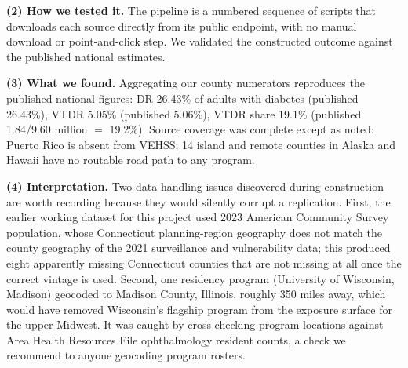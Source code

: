 \documentclass[11pt]{article}
\newcommand{\tpart}[1]{\medskip\noindent\textbf{#1}\quad}
\begin{document}
\tpart{(2) How we tested it.} The pipeline is a numbered sequence of scripts that
downloads each source directly from its public endpoint, with no manual
download or point-and-click step. We validated the constructed outcome against
the published national estimates.

\tpart{(3) What we found.} Aggregating our county numerators reproduces the
published national figures: DR 26.43\% of adults with diabetes (published
26.43\%), VTDR 5.05\% (published 5.06\%), VTDR share 19.1\% (published
1.84/9.60 million $=$ 19.2\%). Source coverage was complete except as noted:
Puerto Rico is absent from VEHSS; 14 island and remote counties in Alaska and
Hawaii have no routable road path to any program.

\tpart{(4) Interpretation.} Two data-handling issues discovered during
construction are worth recording because they would silently corrupt a
replication. First, the earlier working dataset for this project used 2023
American Community Survey population, whose Connecticut planning-region
geography does not match the county geography of the 2021 surveillance and
vulnerability data; this produced eight apparently missing Connecticut counties
that are not missing at all once the correct vintage is used. Second, one
residency program (University of Wisconsin, Madison) geocoded to Madison County,
Illinois, roughly 350 miles away, which would have removed Wisconsin's flagship
program from the exposure surface for the upper Midwest. It was caught by
cross-checking program locations against Area Health Resources File ophthalmology
resident counts, a check we recommend to anyone geocoding program rosters.
\end{document}
